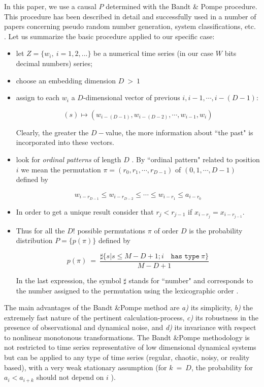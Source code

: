 In this paper, we use a causal $P$ determined with the Bandt \& Pompe procedure. This procedure has been described in detail and successfully used in a number of papers concerning pseudo random number generation, system classifications, etc. \cite{Amigo2005,Rosso2007b,DeMicco2008,DeMicco2009,Amigo2010,Rosso2008}.
Let us summarize the basic procedure applied to our specific case:
\begin{itemize}
\item let $Z=\{w_i,~i=1,2,...\}$ be a numerical time series (in our case $W$ bits decimal numbers) series;
\item choose an embedding dimension $D~>~1$
\item assign to each $w_i$ a $D$-dimensional vector of previous $i, i-1,\cdots,i-(D-1)$:

\begin{equation}
\label{eq:vectores}
(s)\mapsto \left(w_{i-(D-1)},w_{i-(D-2)},\cdots,w_{i-1},w_{i}\right)
\end{equation}

Clearly, the greater the $D-$value, the more information about ``the past" is incorporated into these vectors. 
\item look for \emph{ordinal patterns} of length $D$ \cite{Pompe2002,Keller2003,Keller2005}. By ``ordinal pattern" related to position $i$ we mean the permutation $\pi=(r_0, r_1, \cdots,r_{D-1})$ of $(0, 1, \cdots, D-1)$ defined by

\begin{equation}
\label{eq:permuta}
w_{i-r_{D-1}}\le w_{i-r_{D-2}}\le\cdots\le w_{i-r_{1}}\le a_{i-r_0}
\end{equation}
\item In order to get a unique result consider that $r_j <r_{j-1}$ if $x_{i-r_{j}}=x_{i-r_{j-1}}$. 
\item Thus for all the $D!$ possible permutations $\pi$ of order $D$ is the probability distribution $P=\{p(\pi)\}$ defined by

\begin{equation}
\label{eq:frequ}
p(\pi)~=~ \frac{\sharp \{s|s\leq M-D+1; i \quad \texttt{has type}~\pi\}}{M-D+1}
\end{equation}

In the last expression, the symbol $\sharp$ stands for ``number" and corresponds to the number assigned to the permutation using the lexicographic order . 
\end{itemize}

The main advantages of the Bandt \&Pompe method are {\it a)\/} its simplicity, {\it b)\/} the extremely fast nature of the pertinent calculation-process, {\it c)\/} its robustness in the presence of observational and dynamical noise, and {\it d)\/} its invariance with respect to nonlinear monotonous transformations. The Bandt \&Pompe methodology is not restricted to time series representative of low dimensional dynamical systems but can be applied to any type of time series (regular, chaotic, noisy, or reality based), with a very weak stationary assumption (for $k~=~D$, the probability for $a_i < a_{i+k}$ should not depend on $i$ \cite{Pompe2002}).


